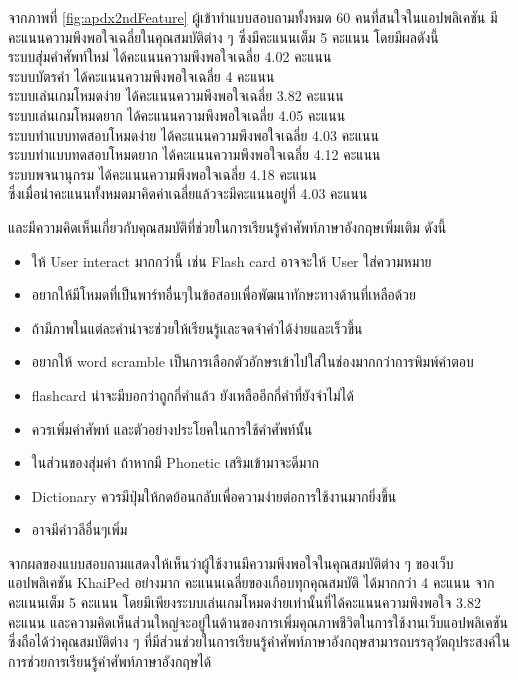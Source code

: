 \documentclass[12pt,oneside,openright,a4paper]{cpe-thai-project}
\begin{document}
\hspace{1cm}
จากภาพที่ \ref{fig:apdx2ndFeature} ผู้เข้าทำแบบสอบถามทั้งหมด 60 คนที่สนใจในแอปพลิเคชัน
มีคะแนนความพึงพอใจเฉลี่ยในคุณสมบัติต่าง ๆ ซึ่งมีคะแนนเต็ม 5 คะแนน โดยมีผลดังนี้
\\ระบบสุ่มคำศัพท์ใหม่ ได้คะแนนความพึงพอใจเฉลี่ย 4.02 คะแนน
\\ระบบบัตรคำ ได้คะแนนความพึงพอใจเฉลี่ย 4 คะแนน
\\ระบบเล่นเกมโหมดง่าย ได้คะแนนความพึงพอใจเฉลี่ย 3.82 คะแนน
\\ระบบเล่นเกมโหมดยาก ได้คะแนนความพึงพอใจเฉลี่ย 4.05 คะแนน
\\ระบบทำแบบทดสอบโหมดง่าย ได้คะแนนความพึงพอใจเฉลี่ย 4.03 คะแนน
\\ระบบทำแบบทดสอบโหมดยาก ได้คะแนนความพึงพอใจเฉลี่ย 4.12 คะแนน
\\ระบบพจนานุกรม ได้คะแนนความพึงพอใจเฉลี่ย 4.18 คะแนน
\\ซึ่งเมื่อนำคะแนนทั้งหมดมาคิดค่าเฉลี่ยแล้วจะมีคะแนนอยู่ที่ 4.03 คะแนน

และมีความคิดเห็นเกี่ยวกับคุณสมบัติที่ช่วยในการเรียนรู้คำศัพท์ภาษาอังกฤษเพิ่มเติม ดังนี้
\begin{itemize}
	\item ให้ User interact มากกว่านี้ เช่น Flash card อาจจะให้ User ใส่ความหมาย
	\item อยากให้มีโหมดที่เป็นพาร์ทอื่นๆในข้อสอบเพื่อพัฒนาทักษะทางด้านที่เหลือด้วย
	\item ถ้ามีภาพในแต่ละคำน่าจะช่วยให้เรียนรู้และจดจำคำได้ง่ายและเร็วขึ้น
	\item อยากให้ word scramble เป็นการเลือกตัวอักษรเข้าไปใส่ในช่องมากกว่าการพิมพ์คำตอบ
	\item flashcard น่าจะมีบอกว่าถูกกี่คำแล้ว ยังเหลืออีกกี่คำที่ยังจำไม่ได้
	\item ควรเพิ่มคำศัพท์ และตัวอย่างประโยคในการใช้คำศัพท์นั้น
	\item ในส่วนของสุ่มคำ ถ้าหากมี Phonetic เสริมเข้ามาจะดีมาก
	\item Dictionary ควรมีปุ่มให้กดย้อนกลับเพื่อความง่ายต่อการใช้งานมากยิ่งขึ้น
	\item อาจมีคำวลีอื่นๆเพิ่ม
\end{itemize}

\hspace{1cm}
จากผลของแบบสอบถามแสดงให้เห็นว่าผู้ใช้งานมีความพึงพอใจในคุณสมบัติต่าง ๆ ของเว็บแอปพลิเคชัน KhaiPed อย่างมาก
คะแนนเฉลี่ยของเกือบทุกคุณสมบัติ ได้มากกว่า 4 คะแนน จากคะแนนเต็ม 5 คะแนน
โดยมีเพียงระบบเล่นเกมโหมดง่ายเท่านั้นที่ได้คะแนนความพึงพอใจ 3.82 คะแนน
และความคิดเห็นส่วนใหญ่จะอยู่ในด้านของการเพิ่มคุณภาพชีวิตในการใช้งานเว็บแอปพลิเคชัน 
ซึ่งถือได้ว่าคุณสมบัติต่าง ๆ ที่มีส่วนช่วยในการเรียนรู้คำศัพท์ภาษาอังกฤษสามารถบรรลุวัตถุประสงค์ในการช่วยการเรียนรู้คำศัพท์ภาษาอังกฤษได้
\end{document}
